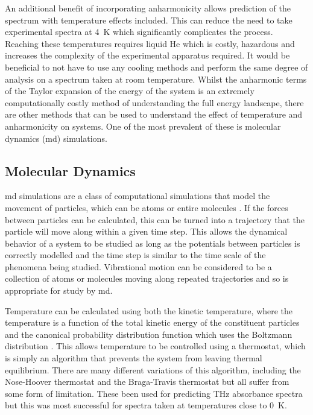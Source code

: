 An additional benefit of incorporating anharmonicity allows prediction of the spectrum with temperature effects included. This can reduce the need to take experimental spectra at \SI{4}{K} which significantly complicates the process. Reaching these temperatures requires liquid He which is costly, hazardous and increases the complexity of the experimental apparatus required. It would be beneficial to not have to use any cooling methods and perform the same degree of analysis on a spectrum taken at room temperature. Whilst the anharmonic terms of the Taylor expansion of the energy of the system is an extremely computationally costly method of understanding the full energy landscape, there are other methods that can be used to understand the effect of temperature and anharmonicity on systems. One of the most prevalent of these is molecular dynamics (\acrshort{md}) simulations.

\subsection{Molecular Dynamics}
\acrshort{md} simulations are a class of computational simulations that model the movement of particles, which can be atoms or entire molecules \DIFdelbegin \DIFdel{~}\DIFdelend \cite{Fermi1955}. If the forces between particles can be calculated, this can be turned into a trajectory that the particle will move along within a given time step. This allows the dynamical behavior of a system to be studied as long as the potentials between particles is correctly modelled and the time step is similar to the time scale of the phenomena being studied. Vibrational motion can be considered to be a collection of atoms or molecules moving along repeated trajectories and so is appropriate for study by \acrshort{md}. 

Temperature can be calculated using both the kinetic temperature, where the temperature is a function of the total kinetic energy of the constituent particles and the canonical probability distribution function which uses the Boltzmann distribution \DIFdelbegin \DIFdel{~}\DIFdelend \cite{Sri2021}. This allows temperature to be controlled using a thermostat, which is simply an algorithm that prevents the system from leaving thermal equilibrium. There are many different variations of this algorithm, including the Nose\nobreakdash-Hoover thermostat \DIFdelbegin \DIFdel{~}\DIFdelend \cite{Braka2003} and the Braga\nobreakdash-Travis thermostat \DIFdelbegin \DIFdel{~}\DIFdelend \cite{Patra2014} but all suffer from some form of limitation. These \DIFdelbegin {}\DIFdelend \DIFaddbegin {}\DIFaddend been used for predicting THz absorbance spectra \DIFdelbegin \DIFdel{~}\DIFdelend \cite{Dai2020} but this was most successful for spectra taken at temperatures close to \SI{0}{K}. 

